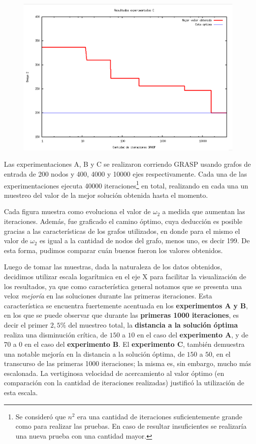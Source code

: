 \begin{figure}[H]
\begin{center}
\includegraphics[angle=0, scale=.5]{imagenes/iteraciones-GRASP-C.png}
\label{Resultados experimentales C}
\end{center}
\end{figure}

Las experimentaciones A, B y C se realizaron corriendo GRASP usando grafos de entrada de 200 nodos y 400, 4000 y 10000 ejes respectivamente. Cada una de las experimentaciones ejecuta 40000 iteraciones\footnote{Se consideró que $n^2$ era una cantidad de iteraciones suficientemente grande como para realizar las pruebas. En caso de resultar insuficientes se realizaría una nueva prueba con una cantidad mayor.} en total, realizando en cada una un muestreo del valor de la mejor solución obtenida hasta el momento.

Cada figura muestra como evoluciona el valor de $\omega_2$ a medida que aumentan las iteraciones. Además, fue graficado el camino óptimo, cuya deducción es posible gracias a las características de los grafos utilizados, en donde para el mismo el valor de $\omega_2$ es igual a la cantidad de nodos del grafo, menos uno, es decir 199. De esta forma, pudimos comparar cuán buenos fueron los valores obtenidos.

Luego de tomar las muestras, dada la naturaleza de los datos obtenidos, decidimos utilizar escala logarítmica en el eje X para facilitar la visualización de los resultados, ya que como característica general notamos que se presenta una veloz \textit{mejoría} en las soluciones durante las primeras iteraciones. Esta característica se encuentra fuertemente acentuada en los \textbf{experimentos A y B}, en los que se puede observar que durante las \textbf{primeras 1000 iteraciones}, es decir el primer $2,5\%$ del muestreo total, la \textbf{distancia a la solución óptima} realiza una disminución crítica, de $150$ a $10$ en el caso del \textbf{experimento A}, y de $70$ a $0$ en el caso del \textbf{experimento B}. El \textbf{experimento C}, también demuestra una notable mejoría en la distancia a la solución óptima, de $150$ a $50$, en el transcurso de las primeras 1000 iteraciones; la misma es, sin embargo, mucho más escalonada. La vertiginosa velocidad de acercamiento al valor óptimo (en comparación con la cantidad de iteraciones realizadas) justificó la utilización de esta escala. 

